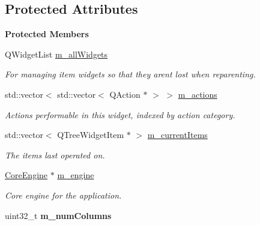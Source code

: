 \subsection*{Protected Attributes}
\begin{Indent}\textbf{ Protected Members}\par
\begin{DoxyCompactItemize}
\item 
\mbox{\label{classrev_1_1_view_1_1_tree_widget_a7938c1b77d69c8ea728b22b17a914876}} 
Q\+Widget\+List \mbox{\hyperlink{classrev_1_1_view_1_1_tree_widget_a7938c1b77d69c8ea728b22b17a914876}{m\+\_\+all\+Widgets}}
\begin{DoxyCompactList}\small\item\em For managing item widgets so that they aren\textquotesingle{}t lost when reparenting. \end{DoxyCompactList}\item 
\mbox{\label{classrev_1_1_view_1_1_tree_widget_af56de24c325d43796f7cd3d7d50000e7}} 
std\+::vector$<$ std\+::vector$<$ Q\+Action $\ast$ $>$ $>$ \mbox{\hyperlink{classrev_1_1_view_1_1_tree_widget_af56de24c325d43796f7cd3d7d50000e7}{m\+\_\+actions}}
\begin{DoxyCompactList}\small\item\em Actions performable in this widget, indexed by action category. \end{DoxyCompactList}\item 
\mbox{\label{classrev_1_1_view_1_1_tree_widget_a7c435da9ae925672b0fe6c9a87ade3b6}} 
std\+::vector$<$ Q\+Tree\+Widget\+Item $\ast$ $>$ \mbox{\hyperlink{classrev_1_1_view_1_1_tree_widget_a7c435da9ae925672b0fe6c9a87ade3b6}{m\+\_\+current\+Items}}
\begin{DoxyCompactList}\small\item\em The items last operated on. \end{DoxyCompactList}\item 
\mbox{\label{classrev_1_1_view_1_1_tree_widget_adbbdee54e17f8597312fae705d5c9392}} 
\mbox{\hyperlink{classrev_1_1_core_engine}{Core\+Engine}} $\ast$ \mbox{\hyperlink{classrev_1_1_view_1_1_tree_widget_adbbdee54e17f8597312fae705d5c9392}{m\+\_\+engine}}
\begin{DoxyCompactList}\small\item\em Core engine for the application. \end{DoxyCompactList}\item 
\mbox{\label{classrev_1_1_view_1_1_tree_widget_a3543083b5db1c0e4951c07623e4991e0}} 
uint32\+\_\+t {\bfseries m\+\_\+num\+Columns}
\end{DoxyCompactItemize}
\end{Indent}
